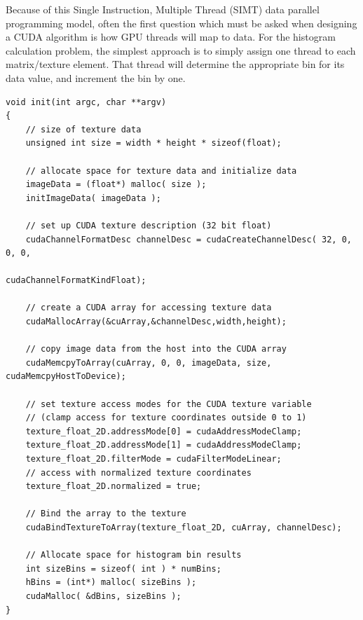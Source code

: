 \documentclass{article}
\begin{document}
Because of this Single Instruction, Multiple Thread (SIMT) data parallel programming model, often the first question which must be asked when designing a CUDA algorithm is how GPU threads will map to data. For the histogram calculation problem, the simplest approach is to simply assign one thread to each matrix/texture element. That thread will determine the appropriate bin for its data value, and increment the bin by one.

\lstset{language=C,basicstyle=\footnotesize}
\begin{minipage}{\textwidth}
\begin{lstlisting}[caption={GPU and CPU Memory Allocation Routine},label={init1}]
void init(int argc, char **argv)
{
    // size of texture data
    unsigned int size = width * height * sizeof(float);

    // allocate space for texture data and initialize data
    imageData = (float*) malloc( size );
    initImageData( imageData );

    // set up CUDA texture description (32 bit float)
    cudaChannelFormatDesc channelDesc = cudaCreateChannelDesc( 32, 0, 0, 0,
                                                 cudaChannelFormatKindFloat);

    // create a CUDA array for accessing texture data
    cudaMallocArray(&cuArray,&channelDesc,width,height);

    // copy image data from the host into the CUDA array
    cudaMemcpyToArray(cuArray, 0, 0, imageData, size, cudaMemcpyHostToDevice);

    // set texture access modes for the CUDA texture variable
    // (clamp access for texture coordinates outside 0 to 1)
    texture_float_2D.addressMode[0] = cudaAddressModeClamp;
    texture_float_2D.addressMode[1] = cudaAddressModeClamp;
    texture_float_2D.filterMode = cudaFilterModeLinear;
    // access with normalized texture coordinates
    texture_float_2D.normalized = true;

    // Bind the array to the texture
    cudaBindTextureToArray(texture_float_2D, cuArray, channelDesc);

    // Allocate space for histogram bin results
    int sizeBins = sizeof( int ) * numBins;
    hBins = (int*) malloc( sizeBins );
    cudaMalloc( &dBins, sizeBins );
}
\end{lstlisting}
\end{minipage}
\end{document}
